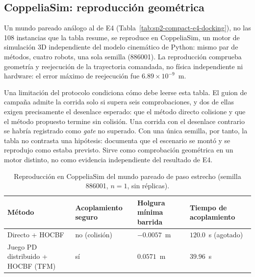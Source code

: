 \clearpage
\subsection{CoppeliaSim: reproducción geométrica}
\label{subsec:coppelia}

Un mundo pareado análogo al de E4 (Tabla~\ref{tab:sp2-compact-e4-docking}), no
las 108 instancias que la tabla resume, se reproduce en CoppeliaSim, un motor
de simulación 3D independiente del modelo cinemático de Python: mismo par de
métodos, cuatro robots, una sola semilla (886001). La reproducción comprueba
geometría y reejecución de la trayectoria comandada, no física independiente
ni hardware: el error máximo de reejecución fue $6.89\times10^{-9}$~m.

Una limitación del protocolo condiciona cómo debe leerse esta tabla. El guion
de campaña admite la corrida solo si supera seis comprobaciones, y dos de
ellas exigen precisamente el desenlace esperado: que el método directo colisione
y que el método propuesto termine sin colisión. Una corrida con el desenlace
contrario se habría registrado como \emph{gate} no superado. Con una única
semilla, por tanto, la tabla no contrasta una hipótesis: documenta que el
escenario se montó y se reprodujo como estaba previsto. Sirve como comprobación
geométrica en un motor distinto, no como evidencia independiente del resultado
de E4.

\begin{table}[!htbp]
  \centering
  \caption[Reproducción en CoppeliaSim del mundo pareado de paso estrecho.]{Reproducción
  en CoppeliaSim del mundo pareado de paso estrecho (semilla 886001, $n=1$, sin réplicas).}
  \label{tab:coppelia-compact-narrow}
  \viutablefont
  \begin{tabularx}{\textwidth}{>{\raggedright\arraybackslash}p{4.2cm} Y Y Y}
    \toprule
    Método & Acoplamiento seguro & Holgura mínima barrida & Tiempo de acoplamiento \\
    \midrule
    Directo + HOCBF & no (colisión) & $-0.0057$~m & $120.0$~s (agotado) \\
    Juego PD distribuido + HOCBF (TFM) & sí & $0.0571$~m & $39.96$~s \\
    \bottomrule
  \end{tabularx}
\end{table}

